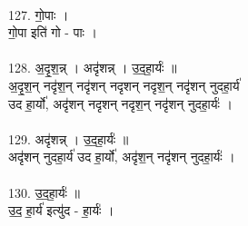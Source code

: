 \\
127. गो॒पाः ।\\
गो॒पा इति॑ गो - पाः ।\\
\\
128. अ॒दृ॒श॒न्न् । अदृ॑शन्न् । उ॒द॒हा॒र्यः॑ ॥\\
अ॒दृ॒श॒न् नदृ॑श॒न् नदृ॑शन् नदृशन् नदृश॒न् नदृ॑शन् नुदहा॒र्य॑\\
उद हा॒र्यो॑, अदृ॑शन् नदृशन् नदृश॒न् नदृ॑शन् नुदहा॒र्यः॑ ।\\
\\
129. अदृ॑शन्न् । उ॒द॒हा॒र्यः॑ ॥\\
अदृ॑शन् नुदहा॒र्य॑ उद हा॒र्यो॑, अदृ॑श॒न् नदृ॑शन् नुदहा॒र्यः॑ ।\\
\\
130. उ॒द॒हा॒र्यः॑ ॥\\
उ॒द॒ हा॒र्य॑ इत्यु॑द - हा॒र्यः॑ ।\\
\\
